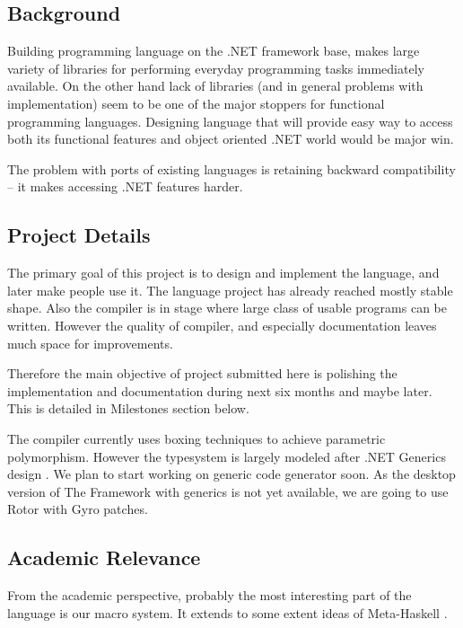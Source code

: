 \documentclass[a4paper,11pt]{article}
\begin{document}
\subsection{Background}
Building programming language on the .NET framework base, makes large
variety of libraries for performing everyday programming tasks immediately
available. On the other hand lack of libraries (and in general problems
with implementation) seem to be one of the major stoppers for functional
programming languages. Designing language that will provide easy way
to access both its functional features and object oriented .NET world
would be major win.

The problem with ports of existing languages is retaining backward
compatibility -- it makes accessing .NET features harder.


\subsection{Project Details}

The primary goal of this project is to design and implement the language,
and later make people use it. The language project has already reached
mostly stable shape. Also the compiler is in stage where large class of
usable programs can be written. However the quality of compiler, and
especially documentation leaves much space for improvements.

Therefore the main objective of project submitted here is polishing the
implementation and documentation during next six months and maybe later.
This is detailed in Milestones section below.

The compiler currently uses boxing techniques to achieve parametric
polymorphism.  However the typesystem is largely modeled after .NET
Generics design \cite{generics}. We plan to start working on generic code
generator soon. As the desktop version of The Framework with generics
is not yet available, we are going to use Rotor with Gyro patches.


\subsection{Academic Relevance}

From the academic perspective, probably the most interesting part of
the language is our macro system. It extends to some extent
ideas of Meta-Haskell \cite{MetaHaskell}.

\end{document}
